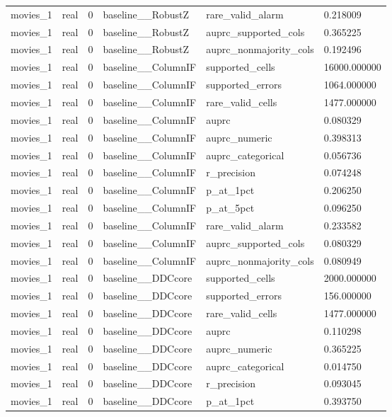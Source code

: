\begin{tabular}{llllll}
movies\_1 & real & 0 & baseline\_\_RobustZ & rare\_valid\_alarm & 0.218009 \\
movies\_1 & real & 0 & baseline\_\_RobustZ & auprc\_supported\_cols & 0.365225 \\
movies\_1 & real & 0 & baseline\_\_RobustZ & auprc\_nonmajority\_cols & 0.192496 \\
movies\_1 & real & 0 & baseline\_\_ColumnIF & supported\_cells & 16000.000000 \\
movies\_1 & real & 0 & baseline\_\_ColumnIF & supported\_errors & 1064.000000 \\
movies\_1 & real & 0 & baseline\_\_ColumnIF & rare\_valid\_cells & 1477.000000 \\
movies\_1 & real & 0 & baseline\_\_ColumnIF & auprc & 0.080329 \\
movies\_1 & real & 0 & baseline\_\_ColumnIF & auprc\_numeric & 0.398313 \\
movies\_1 & real & 0 & baseline\_\_ColumnIF & auprc\_categorical & 0.056736 \\
movies\_1 & real & 0 & baseline\_\_ColumnIF & r\_precision & 0.074248 \\
movies\_1 & real & 0 & baseline\_\_ColumnIF & p\_at\_1pct & 0.206250 \\
movies\_1 & real & 0 & baseline\_\_ColumnIF & p\_at\_5pct & 0.096250 \\
movies\_1 & real & 0 & baseline\_\_ColumnIF & rare\_valid\_alarm & 0.233582 \\
movies\_1 & real & 0 & baseline\_\_ColumnIF & auprc\_supported\_cols & 0.080329 \\
movies\_1 & real & 0 & baseline\_\_ColumnIF & auprc\_nonmajority\_cols & 0.080949 \\
movies\_1 & real & 0 & baseline\_\_DDCcore & supported\_cells & 2000.000000 \\
movies\_1 & real & 0 & baseline\_\_DDCcore & supported\_errors & 156.000000 \\
movies\_1 & real & 0 & baseline\_\_DDCcore & rare\_valid\_cells & 1477.000000 \\
movies\_1 & real & 0 & baseline\_\_DDCcore & auprc & 0.110298 \\
movies\_1 & real & 0 & baseline\_\_DDCcore & auprc\_numeric & 0.365225 \\
movies\_1 & real & 0 & baseline\_\_DDCcore & auprc\_categorical & 0.014750 \\
movies\_1 & real & 0 & baseline\_\_DDCcore & r\_precision & 0.093045 \\
movies\_1 & real & 0 & baseline\_\_DDCcore & p\_at\_1pct & 0.393750 \\

\end{tabular}
